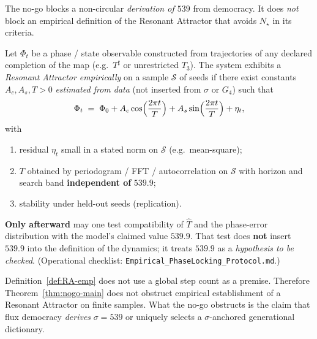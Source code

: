 The no-go blocks a non-circular \emph{derivation of \(539\)} from democracy.
It does \emph{not} block an empirical definition of the Resonant Attractor
that avoids \(N_\star\) in its criteria.

\begin{definition}
\label{def:RA-emp}
Let \(\Phi_t\) be a phase / state observable constructed from trajectories of
any declared completion of the map (e.g.\ \(T^\sharp\) or unrestricted \(T_3\)).
The system exhibits a \emph{Resonant Attractor empirically} on a sample
\(\mathcal{S}\) of seeds if there exist constants
\(A_c,A_s,T>0\) \emph{estimated from data} (not inserted from \(\sigma\) or
\(G_4\)) such that
\begin{equation}
\label{eq:RA}
\Phi_t
\;=\;
\Phi_0
+A_c\cos\Bigl(\frac{2\pi t}{T}\Bigr)
+A_s\sin\Bigl(\frac{2\pi t}{T}\Bigr)
+\eta_t,
\end{equation}
with
\begin{enumerate}[label=(\roman*)]
  \item residual \(\eta_t\) small in a stated norm on \(\mathcal{S}\)
        (e.g.\ mean-square);
  \item \(T\) obtained by periodogram / FFT / autocorrelation on \(\mathcal{S}\)
        with horizon and search band \textbf{independent of} \(539.9\);
  \item stability under held-out seeds (replication).
\end{enumerate}
\textbf{Only afterward} may one test compatibility of \(\hat T\) and the
phase-error distribution with the model's claimed value \(539.9\). That test
does \textbf{not} insert \(539.9\) into the definition of the dynamics; it
treats \(539.9\) as a \emph{hypothesis to be checked}.
(Operational checklist: \texttt{Empirical\_PhaseLocking\_Protocol.md}.)
\end{definition}

\begin{theorem}
\label{thm:emp-outside}
Definition~\ref{def:RA-emp} does not use a global step count as a premise.
Therefore Theorem~\ref{thm:nogo-main} does not obstruct empirical establishment
of a Resonant Attractor on finite samples. What the no-go obstructs is the
claim that flux democracy \emph{derives} \(\sigma=539\) or uniquely selects a
\(\sigma\)-anchored generational dictionary.
\end{theorem}

